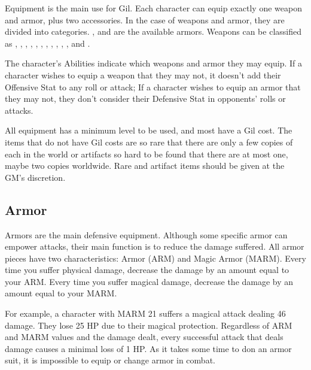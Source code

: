 \begin{multicols}{2}

Equipment is the main use for Gil. Each character can equip exactly one weapon and armor, plus two accessories. In the case of weapons and armor, they are divided into categories. ,  and  are the available armors. Weapons can be classified as , , , , , , , , , , , and .

The character’s Abilities indicate which weapons and armor they may equip. If a character wishes to equip a weapon that they may not, it doesn’t add their Offensive Stat to any roll or attack; If a character wishes to equip an armor that they may not, they don’t consider their Defensive Stat in opponents’ rolls or attacks.

All equipment has a minimum level to be used, and most have a Gil cost. The items that do not have Gil costs are so rare that there are only a few copies of each in the world or artifacts so hard to be found that there are at most one, maybe two copies worldwide. Rare and artifact items should be given at the GM’s discretion.

\subsection{Armor}
\label{subsec:inv-armor}

Armors are the main defensive equipment. Although some specific armor can empower attacks, their main function is to reduce the damage suffered. All armor pieces have two characteristics: Armor (ARM) and Magic Armor (MARM). Every time you suffer physical damage, decrease the damage by an amount equal to your ARM. Every time you suffer magical damage, decrease the damage by an amount equal to your MARM.

\begin{boco}
    For example, a character with MARM 21 suffers a magical attack dealing 46 damage. They lose 25 HP due to their magical protection. Regardless of ARM and MARM values and the damage dealt, every successful attack that deals damage causes a minimal loss of 1 HP. As it takes some time to don an armor suit, it is impossible to equip or change armor in combat.
\end{boco}

\end{multicols}

